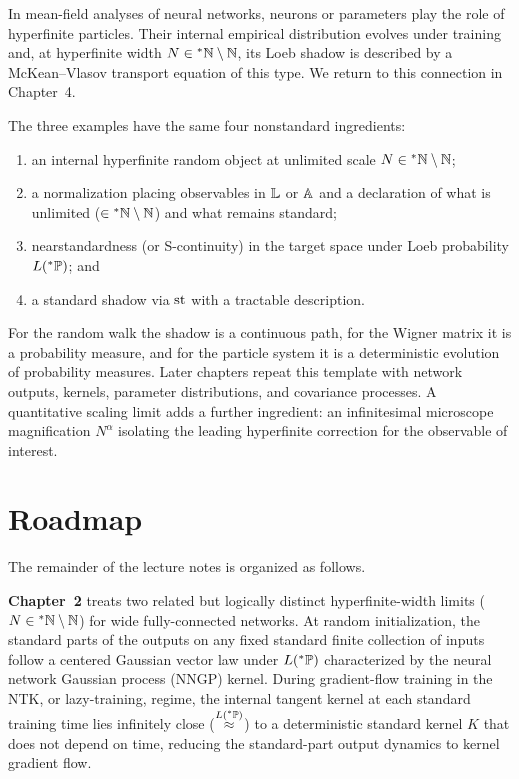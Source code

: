 In mean-field analyses of neural networks, neurons or parameters play the role of hyperfinite particles. Their internal empirical distribution evolves under training and, at hyperfinite width $N \in {}^*\mathbb{N} \setminus \mathbb{N}$, its Loeb shadow is described by a McKean--Vlasov transport equation of this type. We return to this connection in Chapter~4.

\begin{remark}\label{rem:1.6}
The three examples have the same four nonstandard ingredients:
\begin{enumerate}
\item an internal hyperfinite random object at unlimited scale $N \in {}^*\mathbb{N} \setminus \mathbb{N}$;
\item a normalization placing observables in $\mathbb{L}$ or $\mathbb{A}$ and a declaration of what is unlimited ($\in {}^*\mathbb{N} \setminus \mathbb{N}$) and what remains standard;
\item nearstandardness (or S-continuity) in the target space under Loeb probability $L({}^*\mathbb{P})$; and
\item a standard shadow via $\operatorname{st}$ with a tractable description.
\end{enumerate}
For the random walk the shadow is a continuous path, for the Wigner matrix it is a probability measure, and for the particle system it is a deterministic evolution of probability measures. Later chapters repeat this template with network outputs, kernels, parameter distributions, and covariance processes. A quantitative scaling limit adds a further ingredient: an infinitesimal microscope magnification $N^\alpha$ isolating the leading hyperfinite correction for the observable of interest.
\end{remark}

\section{Roadmap}

The remainder of the lecture notes is organized as follows.

\textbf{Chapter~2} treats two related but logically distinct hyperfinite-width limits ($N \in {}^*\mathbb{N} \setminus \mathbb{N}$) for wide fully-connected networks. At random initialization, the standard parts of the outputs on any fixed standard finite collection of inputs follow a centered Gaussian vector law under $L({}^*\mathbb{P})$ characterized by the neural network Gaussian process (NNGP) kernel. During gradient-flow training in the NTK, or lazy-training, regime, the internal tangent kernel at each standard training time lies infinitely close ($\stackrel{L({}^*\mathbb{P})}{\approx}$) to a deterministic standard kernel $K$ that does not depend on time, reducing the standard-part output dynamics to kernel gradient flow.

